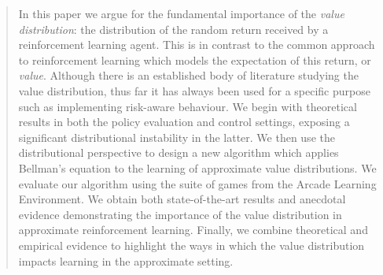 \documentclass{article}
\begin{document}
 

%
\printAffiliationsAndNotice{\icmlEqualContribution} %
%
%

\begin{abstract}
In this paper we argue for the fundamental importance of the \emph{value distribution}: the distribution of the random return received by a reinforcement learning agent. This is in contrast to the common approach to reinforcement learning which models the expectation of this return, or \emph{value}. Although there is an established body of literature studying the value distribution, thus far it has always been used for a specific purpose such as implementing risk-aware behaviour.
We begin with theoretical results in both the policy evaluation and control settings, exposing a significant distributional instability in the latter.
We then use the distributional perspective to design a new algorithm which applies Bellman's equation to the learning of approximate value distributions.
We evaluate our algorithm using the suite of games from the Arcade Learning Environment. We obtain both state-of-the-art results and anecdotal evidence demonstrating the importance of the value distribution in approximate reinforcement learning.
Finally, we combine theoretical and empirical evidence to highlight the ways in which the value distribution impacts learning in the approximate setting.
\end{abstract} 
\end{document}
